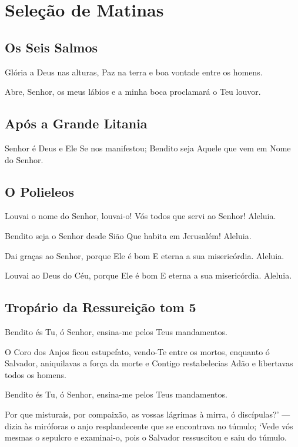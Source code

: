 \documentclass{subfiles}
\begin{document}
\chapter{Seleção de Matinas}

\section*{Os Seis Salmos}

Glória a Deus nas alturas, Paz na terra e boa vontade entre os homens. \thrice{}

Abre, Senhor, os meus lábios e a minha boca proclamará o Teu louvor. 

\section*{Após a Grande Litania}

Senhor é Deus e Ele Se nos manifestou;
Bendito seja Aquele que vem em Nome do Senhor.


\section*{O Polieleos}

Louvai o nome do Senhor, louvai-o! Vós todos que servi ao Senhor! Aleluia.
\thrice{}

Bendito seja o Senhor desde Sião Que habita em Jerusalém! Aleluia. \thrice{}

Dai graças ao Senhor, porque Ele é bom E eterna a sua misericórdia. Aleluia.
\thrice{}

Louvai ao Deus do Céu, porque Ele é bom E eterna a sua misericórdia.
Aleluia. \thrice{}

\section*{Tropário da Ressureição tom 5}

Bendito és Tu, ó Senhor, ensina-me pelos Teus mandamentos.

O Coro dos Anjos ficou estupefato, vendo-Te entre os mortos, enquanto ó
Salvador, aniquilavas a força da morte e Contigo restabelecias Adão e libertavas
todos os homens.

Bendito és Tu, ó Senhor, ensina-me pelos Teus mandamentos.

Por que misturais, por compaixão, as vossas lágrimas à mirra, ó discípulas?’ —
dizia às miróforas o anjo resplandecente que se encontrava no túmulo; ‘Vede vós
mesmas o sepulcro e examinai-o, pois o Salvador ressuscitou e saiu do túmulo.
\end{document}
